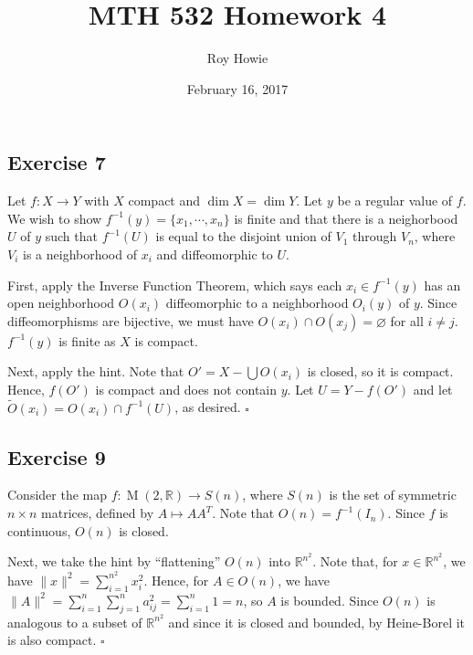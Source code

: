 \documentclass{article}
\newcommand{\R}{\mathbb{R}}
\DeclareMathOperator{\M}{M}
\begin{document}
\title{MTH 532 Homework 4}
\author{Roy Howie}
\date{February 16, 2017}
\maketitle

\subsection*{Exercise 7}
  Let $f\colon X\to Y$ with $X$ compact and $\dim X=\dim Y$. Let $y$ be a
  regular value of $f$. We wish to show $f^{-1}(y)=\{x_1,\cdots,x_n\}$ is
  finite and that there is a neighorbood $U$ of $y$ such that $f^{-1}(U)$ is
  equal to the disjoint union of $V_1$ through $V_n$, where $V_i$ is a
  neighborhood of $x_i$ and diffeomorphic to $U$.

  First, apply the Inverse Function Theorem, which says each $x_i\in f^{-1}(y)$
  has an open neighborhood $O(x_i)$ diffeomorphic to a neighborhood $O_i(y)$ of
  $y$. Since diffeomorphisms are bijective, we must have $O(x_i)\cap O(x_j)=
  \varnothing$ for all $i\ne j$. $f^{-1}(y)$ is finite as $X$ is compact.

  Next, apply the hint. Note that $O'=X-\bigcup{O(x_i)}$ is closed, so it is
  compact. Hence, $f(O')$ is compact and does not contain $y$. Let $U=Y-f(O')$
  and let $\tilde{O}(x_i)=O(x_i)\cap f^{-1}(U)$, as desired.
  \hfill $\square$

\subsection*{Exercise 9}
  Consider the map $f\colon\M(2,\R)\to S(n)$, where $S(n)$ is the set of
  symmetric $n\times n$ matrices, defined by $A\mapsto AA^T$. Note that
  $O(n)=f^{-1}(I_n)$. Since $f$ is continuous, $O(n)$ is closed.

  Next, we take the hint by ``flattening'' $O(n)$ into $\R^{n^2}$. Note that,
  for $x\in\R^{n^2}$, we have $\|x\|^2=\sum_{i=1}^{n^2}x_i^2$. Hence, for $A\in
  O(n)$, we have $\|A\|^2=\sum_{i=1}^n\sum_{j=1}^n{a_{ij}^2}=\sum_{i=1}^{n}1=n$,
  so $A$ is bounded. Since $O(n)$ is analogous to a subset of $\R^{n^2}$ and
  since it is closed and bounded, by Heine-Borel it is also compact.
  \hfill $\square$
\end{document}
